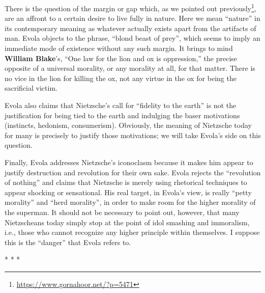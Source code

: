 There is the question of the margin or gap which, as we pointed out previously\footnote{\url{https://www.gornahoor.net/?p=5471}}, are an affront to a certain desire to live fully in nature. Here we mean ``nature'' in its contemporary meaning as whatever actually exists apart from the artifacts of man. Evola objects to the phrase, ``blond beast of prey'', which seems to imply an immediate mode of existence without any such margin. It brings to mind \textbf{William Blake}'s, ``One law for the lion and ox is oppression,'' the precise opposite of a universal morality, or any morality at all, for that matter. There is no vice in the lion for killing the ox, not any virtue in the ox for being the sacrificial victim.

Evola also claims that Nietzsche's call for ``fidelity to the earth'' is not the justification for being tied to the earth and indulging the baser motivations (instincts, hedonism, consumerism). Obviously, the meaning of Nietzsche today for many is precisely to justify those motivations; we will take Evola's side on this question.

Finally, Evola addresses Nietzsche's iconoclasm because it makes him appear to justify destruction and revolution for their own sake. Evola rejects the ``revolution of nothing'' and claims that Nietzsche is merely using rhetorical techniques to appear shocking or sensational. His real target, in Evola's view, is really ``petty morality'' and ``herd morality'', in order to make room for the higher morality of the superman. It should not be necessary to point out, however, that many Nietzscheans today simply stop at the point of idol smashing and immoralism, i.e., those who cannot recognize any higher principle within themselves. I suppose this is the ``danger'' that Evola refers to.



\begin{center}* * *\end{center}

